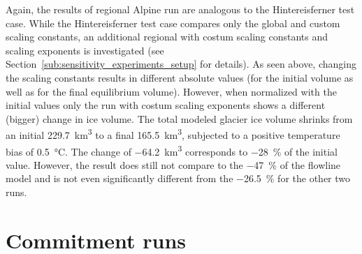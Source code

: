       Again, the results of regional Alpine run are analogous to the Hintereisferner test case. While the Hintereisferner test case compares only the global and custom scaling constants, an additional regional with costum scaling constants and scaling exponents is investigated (see Section~\ref{sub:sensitivity_experiments_setup} for details). As seen above, changing the scaling constants results in different absolute values (for the initial volume as well as for the final equilibrium volume). However, when normalized with the initial values only the run with costum scaling exponents shows a different (bigger) change in ice volume. The total modeled glacier ice volume shrinks from an initial \SI{229.7}{\cubic\kilo\meter} to a final \SI{165.5}{\cubic\kilo\meter}, subjected to a positive temperature bias of \SI{+0.5}{\celsius}. The change of \SI{-64.2}{\cubic\kilo\meter} corresponds to \SI{-28}{\percent} of the initial value. However, the result does still not compare to the \SI{-47}{\percent} of the flowline model and is not even significantly different from the \SI{-26.5}{\percent} for the other two \vas{} runs.




  \section{Commitment runs} %
  \label{sec:commitment_runs_results}







